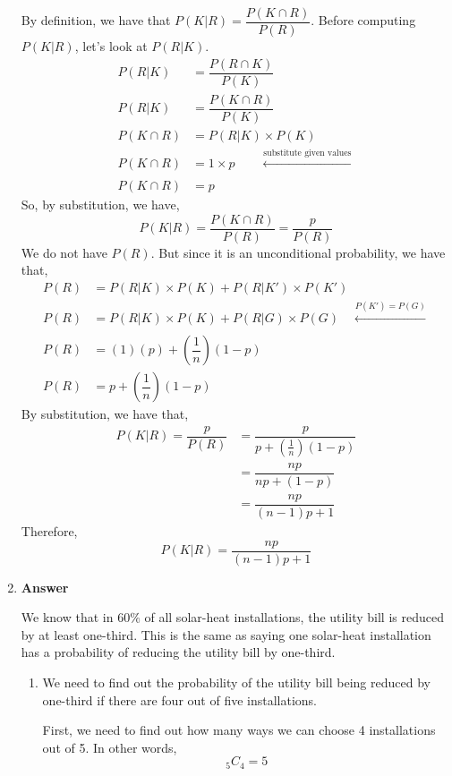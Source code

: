 \documentclass[12pt]{book}
\begin{document}
\begin{enumerate}
    By definition, we have that $P(K|R) = \dfrac{P(K \cap R)}{P(R)}$. Before computing $P(K|R)$, let's look at $P(R|K)$.
    \begin{align*}
        P(R|K) &= \dfrac{P(R \cap K)}{P(K)}\\
        P(R|K) &= \dfrac{P(K \cap R)}{P(K)}\\
        P(K \cap R) &= P(R|K) \times P(K)\\
        P(K \cap R) &= 1 \times p \qquad \xleftarrow[]{\text{substitute given values}}\\
        P(K \cap R) &= p
    \end{align*}
    So, by substitution, we have,
    $$P(K|R) = \dfrac{P(K \cap R)}{P(R)} = \dfrac{p}{P(R)}$$
    We do not have $P(R)$. But since it is an unconditional probability, we have that,
    \begin{align*}
        P(R) &= P(R|K) \times P(K) + P(R|K') \times P(K')\\
        P(R) &= P(R|K) \times P(K) + P(R|G) \times P(G) \quad \xleftarrow[]{P(K') = P(G)}\\
        P(R) &= (1)(p) + \left(\dfrac{1}{n}\right)(1-p)\\
        P(R) &= p + \left(\dfrac{1}{n}\right)(1-p)
    \end{align*}
    By substitution, we have that,
    \begingroup
    \addtolength{\jot}{1em}
    \begin{align*}
        P(K|R) = \dfrac{p}{P(R)} &= \dfrac{p}{p + \left(\frac{1}{n}\right)(1-p)}\\
        &= \dfrac{np}{np + (1-p)}\\
        &= \dfrac{np}{(n-1)p + 1}
    \end{align*}
    \endgroup
    Therefore, $$P(K|R) = \dfrac{np}{(n-1)p + 1}$$
    \newpage

    \item \textbf{Answer}
    
    We know that in $60\%$ of all solar-heat installations, the utility bill is reduced by at least one-third. This is the same as saying one solar-heat installation has a probability of reducing the utility bill by one-third. 
    \begin{enumerate}
        \item We need to find out the probability of the utility bill being reduced by one-third if there are four out of five installations.
        
        First, we need to find out how many ways we can choose 4 installations out of 5. In other words,
        $${}_{5} C_{4} = 5$$
        

\end{enumerate}
\end{enumerate}
\end{document}
